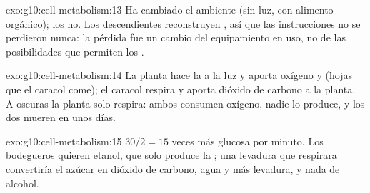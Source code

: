 \begin{solution}{exo:g10:cell-metabolism:13}
Ha cambiado el ambiente (sin luz, con alimento orgánico); los  no.
Los descendientes reconstruyen , así que las instrucciones
no se perdieron nunca: la pérdida fue un cambio del equipamiento en
uso, no de las posibilidades que permiten los .
\end{solution}

\begin{solution}{exo:g10:cell-metabolism:14}
La planta hace la  a la luz y aporta oxígeno y  (hojas que el caracol come); el caracol respira y aporta
dióxido de carbono a la planta. A oscuras la planta solo respira: ambos
consumen oxígeno, nadie lo produce, y los dos mueren en unos días.
\end{solution}

\begin{solution}{exo:g10:cell-metabolism:15}
$30/2 = 15$ veces más glucosa por minuto. Los bodegueros quieren
etanol, que solo produce la ; una levadura que respirara
convertiría el azúcar en dióxido de carbono, agua y más levadura, y
nada de alcohol.
\end{solution}

